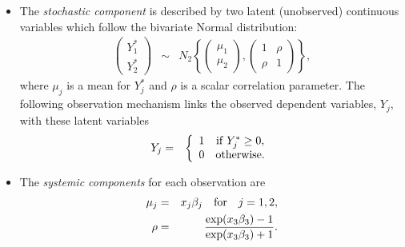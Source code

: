 \documentclass{article}
\begin{document}
\begin{itemize}
\item The \emph{stochastic component} is described by two latent (unobserved)
  continuous variables which follow the bivariate Normal distribution:
\begin{eqnarray*}
  \left ( \begin{array}{c} 
      Y_1^* \\
      Y_2^* 
    \end{array}
  \right ) &\sim &  
  N_2 \left \{ \left ( 
      \begin{array}{c}
        \mu_1 \\ \mu_2
      \end{array} \right ), \left( \begin{array}{cc}
                 1 & \rho \\
                 \rho & 1 
                 \end{array} \right) \right\},
\end{eqnarray*}
where $\mu_j$ is a mean for $Y_j^*$ and $\rho$ is a scalar correlation
parameter. The following observation mechanism links the observed
dependent variables, $Y_j$, with these latent variables
\begin{eqnarray*}
Y_j & = & \left \{ \begin{array}{cc}
                   1 & {\rm if} \; Y_j^* \ge 0, \\
                   0 & {\rm otherwise.}
                   \end{array} 
                   \right.
\end{eqnarray*}


\item The \emph{systemic components} for each observation are 
  \begin{eqnarray*}
    \mu_j & = & x_{j} \beta_j \quad {\rm for} \quad j=1,2, \\
    \rho & = & \frac{\exp(x_3 \beta_3) - 1}{\exp(x_3 \beta_3) + 1}.
\end{eqnarray*}

\end{itemize}
\end{document}
